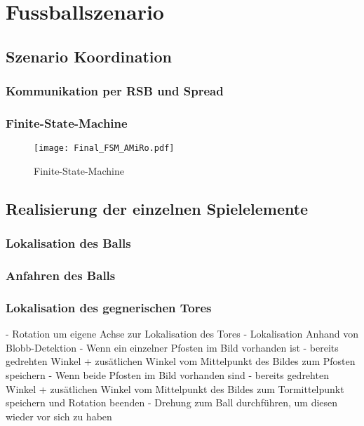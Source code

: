 \chapter{Fussballszenario} \label{kap:Fussballszenario} %

\section{Szenario Koordination} %

\subsection{Kommunikation per RSB und Spread} %

\subsection{Finite-State-Machine} %

\begin{figure}[H]
	\begin{center}
		\texttt{[image: Final\_FSM\_AMiRo.pdf]} 	
		\caption{Finite-State-Machine}
		\label{fig:fsm-amiro}
	\end{center}
\end{figure}

\section{Realisierung der einzelnen Spielelemente} %

\subsection{Lokalisation des Balls} %

\subsection{Anfahren des Balls} %

\subsection{Lokalisation des gegnerischen Tores} %
- Rotation um eigene Achse zur Lokalisation des Tores
- Lokalisation Anhand von Blobb-Detektion 
- Wenn ein einzelner Pfosten im Bild vorhanden ist - bereits gedrehten Winkel + zusätlichen Winkel vom Mittelpunkt des Bildes zum Pfosten speichern
- Wenn beide Pfosten im Bild vorhanden sind - bereits gedrehten Winkel + zusätlichen Winkel vom Mittelpunkt des Bildes zum Tormittelpunkt speichern und Rotation beenden
- Drehung zum Ball durchführen, um diesen wieder vor sich zu haben

